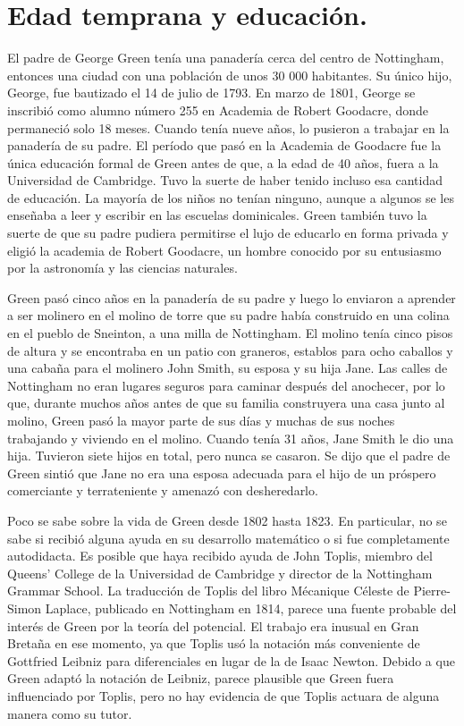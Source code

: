 \section{Edad temprana y educación.}
\par
El padre de George Green tenía una panadería cerca del centro de Nottingham, entonces una ciudad con una población de unos 30 000 habitantes. Su único hijo, George, fue bautizado el 14 de julio de 1793. En marzo de 1801, George se inscribió como alumno número 255 en Academia de Robert Goodacre, donde permaneció solo 18 meses. Cuando tenía nueve años, lo pusieron a trabajar en la panadería de su padre. El período que pasó en la Academia de Goodacre fue la única educación formal de Green antes de que, a la edad de 40 años, fuera a la Universidad de Cambridge. Tuvo la suerte de haber tenido incluso esa cantidad de educación. La mayoría de los niños no tenían ninguno, aunque a algunos se les enseñaba a leer y escribir en las escuelas dominicales. Green también tuvo la suerte de que su padre pudiera permitirse el lujo de educarlo en forma privada y eligió la academia de Robert Goodacre, un hombre conocido por su entusiasmo por la astronomía y las ciencias naturales.
\par
Green pasó cinco años en la panadería de su padre y luego lo enviaron a aprender a ser molinero en el molino de torre que su padre había construido en una colina en el pueblo de Sneinton, a una milla de Nottingham. El molino tenía cinco pisos de altura y se encontraba en un patio con graneros, establos para ocho caballos y una cabaña para el molinero John Smith, su esposa y su hija Jane. Las calles de Nottingham no eran lugares seguros para caminar después del anochecer, por lo que, durante muchos años antes de que su familia construyera una casa junto al molino, Green pasó la mayor parte de sus días y muchas de sus noches trabajando y viviendo en el molino. Cuando tenía 31 años, Jane Smith le dio una hija. Tuvieron siete hijos en total, pero nunca se casaron. Se dijo que el padre de Green sintió que Jane no era una esposa adecuada para el hijo de un próspero comerciante y terrateniente y amenazó con desheredarlo.
\par
Poco se sabe sobre la vida de Green desde 1802 hasta 1823. En particular, no se sabe si recibió alguna ayuda en su desarrollo matemático o si fue completamente autodidacta. Es posible que haya recibido ayuda de John Toplis, miembro del Queens' College de la Universidad de Cambridge y director de la Nottingham Grammar School. La traducción de Toplis del libro Mécanique Céleste de Pierre-Simon Laplace, publicado en Nottingham en 1814, parece una fuente probable del interés de Green por la teoría del potencial. El trabajo era inusual en Gran Bretaña en ese momento, ya que Toplis usó la notación más conveniente de Gottfried Leibniz para diferenciales en lugar de la de Isaac Newton. Debido a que Green adaptó la notación de Leibniz, parece plausible que Green fuera influenciado por Toplis, pero no hay evidencia de que Toplis actuara de alguna manera como su tutor.
